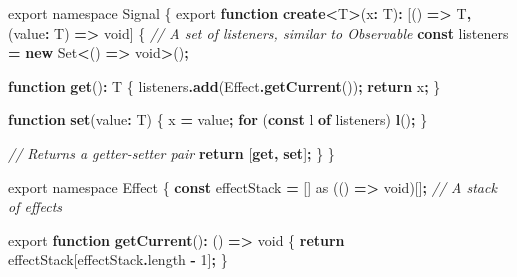 \documentclass[
  openany]{book}
\newenvironment{Shaded}{\begin{snugshade}}{\end{snugshade}}
\newcommand{\AttributeTok}[1]{\textcolor[rgb]{0.13,0.29,0.53}{#1}}
\newcommand{\BuiltInTok}[1]{#1}
\newcommand{\CommentTok}[1]{\textcolor[rgb]{0.56,0.35,0.01}{\textit{#1}}}
\newcommand{\ControlFlowTok}[1]{\textcolor[rgb]{0.13,0.29,0.53}{\textbf{#1}}}
\newcommand{\DataTypeTok}[1]{\textcolor[rgb]{0.13,0.29,0.53}{#1}}
\newcommand{\DecValTok}[1]{\textcolor[rgb]{0.00,0.00,0.81}{#1}}
\newcommand{\FunctionTok}[1]{\textcolor[rgb]{0.13,0.29,0.53}{\textbf{#1}}}
\newcommand{\ImportTok}[1]{#1}
\newcommand{\KeywordTok}[1]{\textcolor[rgb]{0.13,0.29,0.53}{\textbf{#1}}}
\newcommand{\NormalTok}[1]{#1}
\newcommand{\OperatorTok}[1]{\textcolor[rgb]{0.81,0.36,0.00}{\textbf{#1}}}
\theoremstyle{definition}
\theoremstyle{definition}
\theoremstyle{definition}
\theoremstyle{definition}
\theoremstyle{remark}
\begin{document}
\begin{Shaded}
\begin{Highlighting}[]
\ImportTok{export} \ImportTok{namespace} \DataTypeTok{Signal}\NormalTok{ \{}
  \ImportTok{export} \KeywordTok{function} \FunctionTok{create}\OperatorTok{\textless{}}\NormalTok{T}\OperatorTok{\textgreater{}}\NormalTok{(x}\OperatorTok{:}\NormalTok{ T)}\OperatorTok{:}\NormalTok{ [() }\KeywordTok{=\textgreater{}}\NormalTok{ T}\OperatorTok{,}\NormalTok{ (value}\OperatorTok{:}\NormalTok{ T) }\KeywordTok{=\textgreater{}} \DataTypeTok{void}\NormalTok{] \{}
    \CommentTok{// A set of listeners, similar to Observable}
    \KeywordTok{const}\NormalTok{ listeners }\OperatorTok{=} \KeywordTok{new} \BuiltInTok{Set}\OperatorTok{\textless{}}\NormalTok{() }\KeywordTok{=\textgreater{}} \DataTypeTok{void}\OperatorTok{\textgreater{}}\NormalTok{()}\OperatorTok{;}

    \KeywordTok{function} \KeywordTok{get}\NormalTok{()}\OperatorTok{:}\NormalTok{ T \{}
\NormalTok{      listeners}\OperatorTok{.}\FunctionTok{add}\NormalTok{(Effect}\OperatorTok{.}\FunctionTok{getCurrent}\NormalTok{())}\OperatorTok{;}
      \ControlFlowTok{return}\NormalTok{ x}\OperatorTok{;}
\NormalTok{    \}}

    \KeywordTok{function} \KeywordTok{set}\NormalTok{(value}\OperatorTok{:}\NormalTok{ T) \{}
\NormalTok{      x }\OperatorTok{=}\NormalTok{ value}\OperatorTok{;}
      \ControlFlowTok{for}\NormalTok{ (}\KeywordTok{const}\NormalTok{ l }\KeywordTok{of}\NormalTok{ listeners) }\FunctionTok{l}\NormalTok{()}\OperatorTok{;}
\NormalTok{    \}}

    \CommentTok{// Returns a getter{-}setter pair}
    \ControlFlowTok{return}\NormalTok{ [}\KeywordTok{get}\OperatorTok{,} \KeywordTok{set}\NormalTok{]}\OperatorTok{;}
\NormalTok{  \}}
\NormalTok{\}}

\ImportTok{export} \ImportTok{namespace} \DataTypeTok{Effect}\NormalTok{ \{}
  \KeywordTok{const}\NormalTok{ effectStack }\OperatorTok{=}\NormalTok{ [] }\ImportTok{as}\NormalTok{ (() }\KeywordTok{=\textgreater{}} \DataTypeTok{void}\NormalTok{)[]}\OperatorTok{;} \CommentTok{// A stack of effects}

  \ImportTok{export} \KeywordTok{function} \FunctionTok{getCurrent}\NormalTok{()}\OperatorTok{:}\NormalTok{ () }\KeywordTok{=\textgreater{}} \DataTypeTok{void}\NormalTok{ \{}
    \ControlFlowTok{return}\NormalTok{ effectStack[effectStack}\OperatorTok{.}\AttributeTok{length} \OperatorTok{{-}} \DecValTok{1}\NormalTok{]}\OperatorTok{;}
\NormalTok{  \}}


\end{Highlighting}
\end{Shaded}
\end{document}
